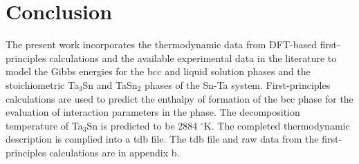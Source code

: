 \section{Conclusion}

The present work incorporates the thermodynamic data from DFT-based first-principles calculations and the available experimental data in the literature to model the Gibbs energies for the bcc and liquid solution phases and the stoichiometric Ta$_3$Sn and TaSn$_2$ phases of the Sn-Ta system.  First-principles calculations are used to predict the enthalpy of formation of the bcc phase for the evaluation of interaction parameters in the phase. The decomposition temperature of Ta$_3$Sn is predicted to be 2884 $^\circ$K. The completed thermodynamic description is complied into a tdb file. The tdb file and raw data from the first-principles calculations are in appendix b.

